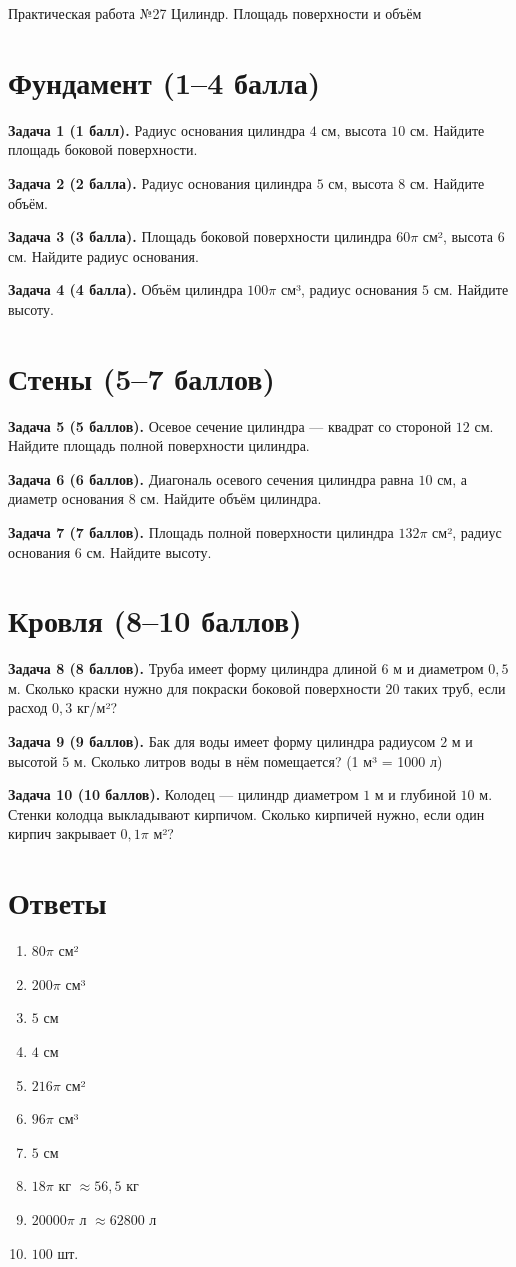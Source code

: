 \documentclass{umk-matematika}
\begin{document}
\maketitlepage
    {Практическая работа №27}
    {Цилиндр. Площадь поверхности и объём}
    {}

\section{Фундамент (1--4 балла)}

\textbf{Задача 1 (1 балл).} Радиус основания цилиндра $4$ см, высота $10$ см. Найдите площадь боковой поверхности.

\textbf{Задача 2 (2 балла).} Радиус основания цилиндра $5$ см, высота $8$ см. Найдите объём.

\textbf{Задача 3 (3 балла).} Площадь боковой поверхности цилиндра $60\pi$ см², высота $6$ см. Найдите радиус основания.

\textbf{Задача 4 (4 балла).} Объём цилиндра $100\pi$ см³, радиус основания $5$ см. Найдите высоту.

\section{Стены (5--7 баллов)}

\textbf{Задача 5 (5 баллов).} Осевое сечение цилиндра — квадрат со стороной $12$ см. Найдите площадь полной поверхности цилиндра.

\textbf{Задача 6 (6 баллов).} Диагональ осевого сечения цилиндра равна $10$ см, а диаметр основания $8$ см. Найдите объём цилиндра.

\textbf{Задача 7 (7 баллов).} Площадь полной поверхности цилиндра $132\pi$ см², радиус основания $6$ см. Найдите высоту.

\section{Кровля (8--10 баллов)}

\textbf{Задача 8 (8 баллов).} Труба имеет форму цилиндра длиной $6$ м и диаметром $0{,}5$ м. Сколько краски нужно для покраски боковой поверхности $20$ таких труб, если расход $0{,}3$ кг/м²?

\textbf{Задача 9 (9 баллов).} Бак для воды имеет форму цилиндра радиусом $2$ м и высотой $5$ м. Сколько литров воды в нём помещается? (1 м³ = 1000 л)

\textbf{Задача 10 (10 баллов).} Колодец — цилиндр диаметром $1$ м и глубиной $10$ м. Стенки колодца выкладывают кирпичом. Сколько кирпичей нужно, если один кирпич закрывает $0{,}1\pi$ м²?

\newpage
\section*{Ответы}

\begin{enumerate}
  \item $80\pi$ см²
  \item $200\pi$ см³
  \item $5$ см
  \item $4$ см
  \item $216\pi$ см²
  \item $96\pi$ см³
  \item $5$ см
  \item $18\pi$ кг $\approx 56{,}5$ кг
  \item $20000\pi$ л $\approx 62800$ л
  \item $100$ шт.
\end{enumerate}
\end{document}
